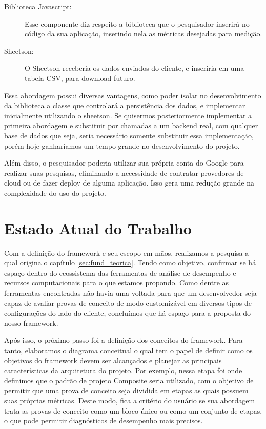 \documentclass[12pt]{tcc}
\begin{document}
\begin{description}
	\item[Biblioteca Javascript:] Esse componente diz respeito a biblioteca que o pesquisador inserirá no código da sua aplicação, inserindo nela as métricas desejadas para medição.
	
	\item[Sheetson:] O Sheetson receberia os dados enviados do cliente, e inseriria em uma tabela CSV, para download futuro.

\end{description}

Essa abordagem possui diversas vantagens, como poder isolar no desenvolvimento da biblioteca a classe que controlará a persistência dos dados, e implementar inicialmente utilizando o sheetson. Se quisermos posteriormente implementar a primeira abordagem e substituir por chamadas a um backend real, com qualquer base de dados que seja, seria necessário somente substituir essa implementação, porém hoje ganharíamos um tempo grande no desenvolvimento do projeto.

Além disso, o pesquisador poderia utilizar sua própria conta do Google para realizar suas pesquisas, eliminando a necessidade de contratar provedores de cloud ou de fazer deploy de alguma aplicação. Isso gera uma redução grande na complexidade do uso do projeto.


\chapter{Estado Atual do Trabalho}
\label{sec:curr_state}

Com a definição do framework e seu escopo em mãos, realizamos a pesquisa a qual origina o capítulo \ref{sec:fund_teorica}.
Tendo como objetivo, confirmar se há espaço dentro do ecossistema das ferramentas de análise de desempenho e recursos computacionais para o que estamos propondo.
Como dentre as ferramentas encontradas não havia uma voltada para que um desenvolvedor seja capaz de avaliar provas de conceito de modo customizável em diversos tipos de configurações do lado do cliente, concluímos que há espaço para a proposta do nosso framework.

Após isso, o próximo passo foi a definição dos conceitos do framework.
Para tanto, elaboramos o diagrama conceitual o qual tem o papel de definir como os objetivos do framework devem ser alcançados e planejar as principais características da arquitetura do projeto.
Por exemplo, nessa etapa foi onde definimos que o padrão de projeto Composite seria utilizado, com o objetivo de permitir que uma prova de conceito seja dividida em etapas as quais possuem suas próprias métricas.
Deste modo, fica a critério do usuário se sua abordagem trata as provas de conceito como um bloco único ou como um conjunto de etapas, o que pode permitir diagnósticos de desempenho mais precisos.
\end{document}
